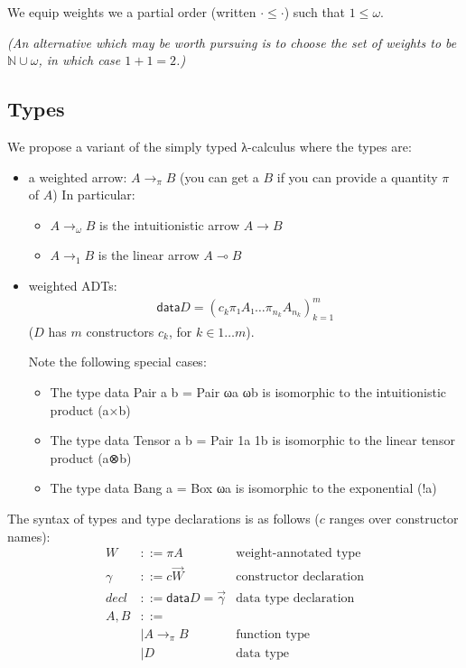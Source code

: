 \documentclass[11pt]{article}
\begin{document}
We equip weights we a partial order (written \(· ≤ ·\)) such that \(1 ≤ ω\).

\emph{(An alternative which may be worth pursuing is to choose the set of
weights to be \(ℕ∪{ω}\), in which case \(1+1=2\).)}

\subsection{Types}
\label{sec:orgheadline2}

We propose a variant of the simply typed λ-calculus where the types
are:

\begin{itemize}
\item a weighted arrow: \(A →_π B\) (you can get a \(B\) if you can provide a
quantity \(π\) of \(A\))
In particular:
\begin{itemize}
\item \(A →_ω B\) is the intuitionistic arrow \(A → B\)
\item \(A →_1 B\) is the linear arrow \(A ⊸ B\)
\end{itemize}
\item weighted ADTs:
\begin{align*}
\mathsf{data} D = (c_k  π₁ A₁  …  π_{n_k} A_{n_k})^m_{k=1}
\end{align*}
(\(D\) has \(m\) constructors \(c_k\), for \(k ∈ 1…m\)).

Note the following special cases:
\begin{itemize}
\item The type data Pair a b = Pair ωa ωb is isomorphic to the intuitionistic product (a×b)
\item The type data Tensor a b = Pair 1a 1b is isomorphic to the linear tensor product (a⊗b)
\item The type data Bang a = Box ωa is isomorphic to the exponential (!a)
\end{itemize}
\end{itemize}

The syntax of types and type declarations is as follows ($c$ ranges over constructor names):
\begin{align*}
  W &::= πA &\text{weight-annotated type}\\
  γ &::= c  \vec{W}&\text{constructor declaration}\\
  decl &::= \mathsf{data } D = \vec{γ}&\text{data type declaration}\\
  A,B &::=\\
      & |  A →_π B &\text{function type}\\
      & |  D &\text{data type}
\end{align*}
\end{document}

